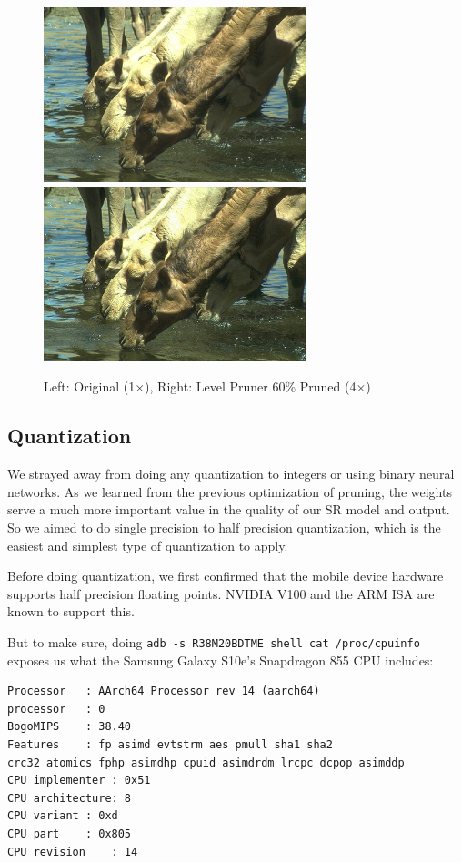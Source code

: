\documentclass{article}
\begin{document}
\begin{figure}
    \centerline{\includegraphics[width=3in]{../final/figures/camel_original.jpg}\includegraphics[width=3in]{../final/figures/camel_level_60.jpg}}
    \caption{Left: Original (1$\times$), Right: Level Pruner 60\% Pruned (4$\times$)}
    \label{fig:final-pruned}
\end{figure}



\subsection{Quantization}
We strayed away from doing any quantization to integers or using binary neural networks. As we learned from the previous optimization of pruning, the weights serve a much more important value in the quality of our SR model and output. So we aimed to do single precision to half precision quantization, which is the easiest and simplest type of quantization to apply.

Before doing quantization, we first confirmed that the mobile device hardware supports half precision floating points. NVIDIA V100 and the ARM ISA are known to support this. 

But to make sure, doing \verb|adb -s R38M20BDTME shell cat /proc/cpuinfo| exposes us what the Samsung Galaxy S10e's Snapdragon 855 CPU includes:
\begin{verbatim}
Processor	: AArch64 Processor rev 14 (aarch64)
processor	: 0
BogoMIPS	: 38.40
Features	: fp asimd evtstrm aes pmull sha1 sha2 
crc32 atomics fphp asimdhp cpuid asimdrdm lrcpc dcpop asimddp
CPU implementer	: 0x51
CPU architecture: 8
CPU variant	: 0xd
CPU part	: 0x805
CPU revision	: 14
\end{verbatim}
\end{document}
